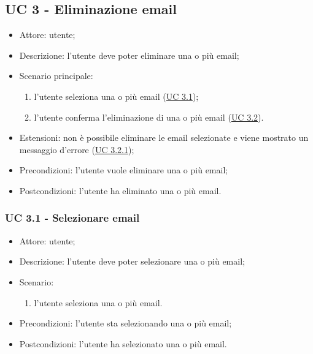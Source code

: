     \subsection{UC 3 - Eliminazione email} \label{sec: UC 3}
    \begin{itemize}
        \item Attore: utente;
        \item Descrizione: l'utente deve poter eliminare una o più email;
        \item Scenario principale:
            \begin{enumerate}
            \item l’utente seleziona una o più email (\hyperref[sec: UC 3.1]{UC 3.1});
            \item l’utente conferma l'eliminazione di una o più email (\hyperref[sec: UC 3.2]{UC 3.2}).
            \end{enumerate}
        \item Estensioni: non è possibile eliminare le email selezionate e viene mostrato un messaggio d'errore (\hyperref[sec: UC 3.2.1]{UC 3.2.1});
        \item Precondizioni: l'utente vuole eliminare una o più email;
        \item Postcondizioni: l'utente ha eliminato una o più email.
    \end{itemize}

    \subsubsection{UC 3.1 - Selezionare email} \label{sec: UC 3.1}
    \begin{itemize}
        \item Attore: utente;
        \item Descrizione: l'utente deve poter selezionare una o più email;
        \item Scenario:
            \begin{enumerate}
            \item l'utente seleziona una o più email.
            \end{enumerate}
        \item Precondizioni: l'utente sta selezionando una o più email;
        \item Postcondizioni: l'utente ha selezionato una o più email.
    \end{itemize}

